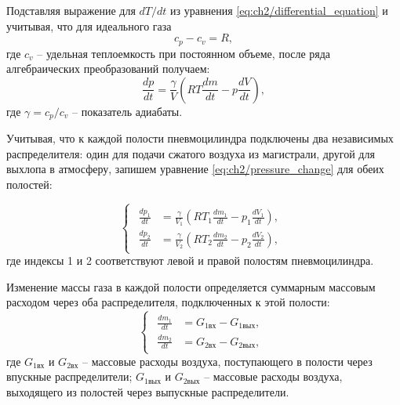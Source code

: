 Подставляя выражение для $dT/dt$ из уравнения \eqref{eq:ch2/differential_equation} и учитывая, что для идеального газа
\begin{equation}
\label{eq:ch2/specific_heat_difference}
    c_p - c_v = R,
\end{equation}
где $c_v$ -- удельная теплоемкость при постоянном объеме, после ряда алгебраических преобразований получаем:
\begin{equation}
\label{eq:ch2/pressure_change}
    \frac{dp}{dt} = \frac{\gamma}{V}\left(RT\frac{dm}{dt} - p\frac{dV}{dt}\right),
\end{equation}
где $\gamma = c_p/c_v$ -- показатель адиабаты.

Учитывая, что к каждой полости пневмоцилиндра подключены два независимых распределителя:
один для подачи сжатого воздуха из магистрали, другой для выхлопа в атмосферу,
запишем уравнение \eqref{eq:ch2/pressure_change} для обеих полостей:

\begin{equation}
\label{eq:ch2/pressure_system}
    \begin{cases}
        \begin{aligned}
            \frac{dp_1}{dt} & = \frac{\gamma}{V_1}\left(RT_1\frac{dm_1}{dt} - p_1\frac{dV_1}{dt}\right), \\
            \frac{dp_2}{dt} & = \frac{\gamma}{V_2}\left(RT_2\frac{dm_2}{dt} - p_2\frac{dV_2}{dt}\right),
        \end{aligned}
    \end{cases}
\end{equation}
где индексы 1 и 2 соответствуют левой и правой полостям пневмоцилиндра.

Изменение массы газа в каждой полости определяется суммарным массовым
расходом через оба распределителя, подключенных к этой полости:
\begin{equation}
\label{eq:ch2/mass_change}
    \begin{cases}
        \begin{aligned}
            \frac{dm_1}{dt} & = G_{1\text{вх}} - G_{1\text{вых}}, \\
            \frac{dm_2}{dt} & = G_{2\text{вх}} - G_{2\text{вых}},
        \end{aligned}
    \end{cases}
\end{equation}
где $G_{1\text{вх}}$ и $G_{2\text{вх}}$ -- массовые расходы воздуха, поступающего в полости через впускные распределители;
$G_{1\text{вых}}$ и $G_{2\text{вых}}$ -- массовые расходы воздуха, выходящего из полостей через выпускные распределители.


